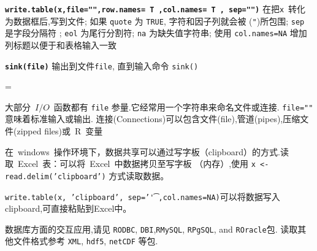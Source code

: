 \documentclass[landscape]{article}
\makeatletter
\renewcommand\section{\@startsection{section}{1}{0mm}%
                                     {0.5ex}%
                                     {0.5ex}%
                                {\color{black}\normalfont\large\bfseries}}
\newcommand{\code}{\texttt}
\newcommand{\bcode}[1]{\texttt{\textbf{#1}}}
\makeatother
\begin{document}
\begin{multicols*}{3}
\bcode{write.table(x,file="",row.names= T ,col.names= T , sep="")}
在把\code{x}~转化为数据框后,写到文件; 如果 \code{quote} 为
                 \code{TRUE}, 字符和因子列就会被 (\code{"})所包围; \code{sep} 是字段分隔符
                 ; \code{eol} 为尾行分割符;
                 \code{na} 为缺失值字符串; 使用
                 \code{col.names=NA} 增加列标题以便于和表格输入一致

\bcode{sink(file)} 输出到文件\code{file}, 直到输入命令 \code{sink()}

\everypar={\hangindent=9mm}
\vspace{2mm}

大部分~$I/O$~函数都有 \code{file} 参量.它经常用一个字符串来命名文件或连接. \code{file=""} 意味着标准输入或输出.
连接(Connections)可以包含文件(file),管道(pipes),压缩文件(zipped files)或~R~变量

在~windows~操作环境下，数据共享可以通过写字板（clipboard）的方式.读取~Excel~表：可以将~Excel~中数据拷贝至写字板
（内存）,使用 \code{x <- read.delim('clipboard')} 方式读取数据。

\code{write.table(x, 'clipboard', sep='\t',col.names=NA)}可以将数据写入clipboard,可直接粘贴到Excel中。

数据库方面的交互应用,请见 \code{RODBC}, \code{DBI},\code{RMySQL}, \code{RPgSQL}, and \code{ROracle}包.
读取其他文件格式参考 \code{XML}, \code{hdf5}, \code{netCDF} 等包.




\end{multicols*}
\end{document}
